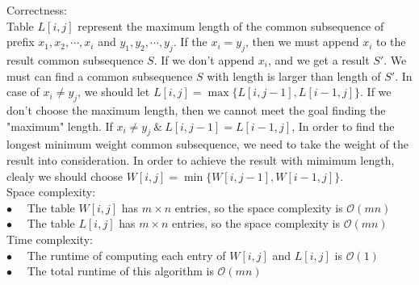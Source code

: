 \documentclass[12pt,letterpaper]{article}
\begin{document}
Correctness: \\
Table $L[i,j]$ represent the maximum length of the common subsequence of prefix $x_1,x_2,\cdots,x_i$ and $y_1,y_2,\cdots,y_j$. If the $x_i = y_j$, then we must append $x_i$ to the result common subsequence $S$. If we don't append $x_i$, and we get a result $S'$. We must can find a common subsequence $S$ with length is larger than length of $S'$. In case of $x_i \neq y_j$, we should let $L[i,j] = \max \{ L[i,j-1], L[i-1,j] \}$. If we don't choose the maximum length, then we cannot meet the goal finding the "maximum" length. If $x_i \neq y_j \ \&\  L[i,j-1] = L[i-1,j]$, In order to find the longest minimum weight common subsequence, we need to take the weight of the result into consideration. In order to achieve the result with mimimum length, clealy we should choose $W[i,j] = \min \{ W[i,j-1], W[i-1,j] \}$. \\
Space complexity: \\
$\bullet \quad$ The table $W[i,j]$ has $m \times n$ entries, so the space complexity is $\mathcal{O}(mn)$ \\
$\bullet \quad$ The table $L[i,j]$ has $m \times n$ entries, so the space complexity is $\mathcal{O}(mn)$ \\
Time complexity: \\
$\bullet \quad$ The runtime of computing each entry of $W[i,j]$ and $L[i,j]$ is $\mathcal{O}(1)$ \\
$\bullet \quad$ The total runtime of this algorithm is $\mathcal{O}(mn)$ \\
\end{document}
